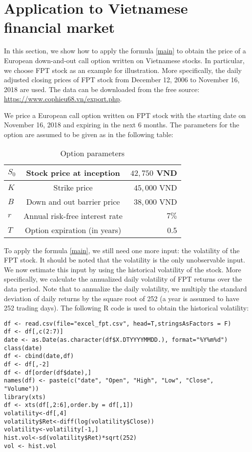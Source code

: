 \documentclass[12pt]{article}
\begin{document}
\section{Application to Vietnamese financial market}
In this section, we show how to apply the formula \eqref{main} to obtain the price of a European down-and-out call option written on Vietnamese stocks. In particular, we choose FPT stock as an example for illustration.
More specifically, the daily adjusted closing prices of FPT stock from December 12, 2006 to November 16, 2018 are used. The data can be downloaded from the free source:
\href{url}{https://www.cophieu68.vn/export.php}.  

We price a European call option written on FPT stock with the starting date on November 16, 2018 and expiring in the next 6 months. The parameters for the option are assumed to be given as in the following table: 
\begin{table}[!htp]
	\centering
	\begin{tabular}{|l|c|r|}
		\hline
		$S_0$ & Stock price at inception   & $42,750$ VND\\
		\hline
		$K$ & Strike price  & $45,000$ VND\\
		\hline
		$B$ & Down and out barrier price & $38,000$ VND\\
		\hline
		$r$ & Annual risk-free interest rate  & $7\%$ \\
		\hline
		$T$ & Option expiration (in years)  & 0.5\\
		\hline	
	\end{tabular}
	\caption{Option parameters}
	\label{B4.1}
\end{table}
To apply the formula \eqref{main}, we still need one more input: the volatility of the FPT stock. It should be noted that the volatility is the only unobservable input. We now estimate this input by using the historical volatility of the stock. More specifically, we calculate
the annualized daily volatility of FPT returns over the data period. Note that to
annualize the daily volatility, we multiply the standard deviation of daily returns by
the square root of 252 (a year is assumed to have 252 trading days). The following R code is used to obtain the historical volatility:
\begin{lstlisting}
df <- read.csv(file="excel_fpt.csv", head=T,stringsAsFactors = F)
df <- df[,c(2:7)]
date <- as.Date(as.character(df$X.DTYYYYMMDD.), format="%Y%m%d")
class(date)
df <- cbind(date,df)
df <- df[,-2]
df <- df[order(df$date),]
names(df) <- paste(c("date", "Open", "High", "Low", "Close", "Volume"))
library(xts)
df <- xts(df[,2:6],order.by = df[,1])
volatility<-df[,4]
volatility$Ret<-diff(log(volatility$Close))
volatility<-volatility[-1,]
hist.vol<-sd(volatility$Ret)*sqrt(252)
vol <- hist.vol
\end{lstlisting}
\end{document}
